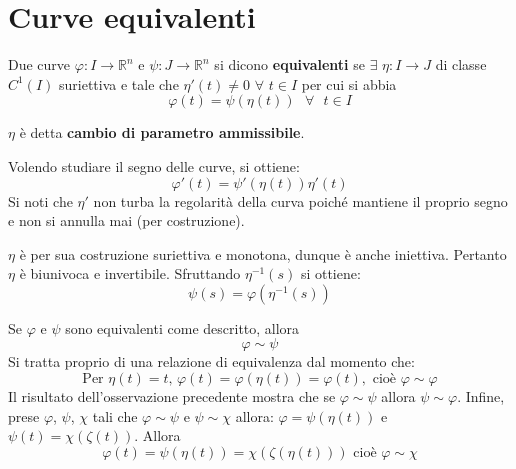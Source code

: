 \section{Curve equivalenti}
\begin{definition}
    Due curve $\varphi: I\to \mathbb{R}^n$ e $\psi:J\to \mathbb{R}^n$ si dicono \textbf{equivalenti} se $\exists$ $\eta:I\to J$ di classe $C^1(I)$ suriettiva e tale che $\eta'(t) \neq 0$ $\forall$ $t \in I$ per cui si abbia
    \begin{equation}
        \varphi(t)=\psi(\eta(t)) \text{ } \forall \text{ } t \in I
    \end{equation}
\end{definition}
\begin{oss}
    $\eta$ è detta \textbf{cambio di parametro ammissibile}. 
\end{oss}
\begin{oss}
    Volendo studiare il segno delle curve, si ottiene:
    \begin{equation*}
        \varphi'(t)=\psi'(\eta(t))\eta'(t)
    \end{equation*}
    Si noti che $\eta'$ non turba la regolarità della curva poiché mantiene il proprio segno e non si annulla mai (per costruzione).
\end{oss}
\begin{oss}
    $\eta$ è per sua costruzione suriettiva e monotona, dunque è anche iniettiva. Pertanto $\eta$ è biunivoca e invertibile. Sfruttando $\eta^{-1}(s)$ si ottiene:
    \begin{equation}
        \psi(s)=\varphi(\eta^{-1}(s))
    \end{equation}
\end{oss}
\begin{oss}
    Se $\varphi$ e $\psi$ sono equivalenti come descritto, allora
    \begin{equation}
        \varphi\sim\psi
    \end{equation}
    Si tratta proprio di una relazione di equivalenza dal momento che:
    \begin{equation}
        \text{Per } \eta(t)=t \text{, } \varphi(t)=\varphi(\eta(t))=\varphi(t), \text{ cioè } \varphi\sim\varphi
    \end{equation}
    Il risultato dell'osservazione precedente mostra che se $\varphi\sim\psi$ allora $\psi\sim\varphi$.
    Infine, prese $\varphi$, $\psi$, $\chi$ tali che $\varphi\sim\psi$ e $\psi\sim\chi$ allora:
    $\varphi=\psi(\eta(t))$ e $\psi(t)=\chi(\zeta(t))$. Allora
    \begin{equation}
        \varphi(t)=\psi(\eta(t))=\chi(\zeta(\eta(t))) \text{ cioè } \varphi\sim\chi
    \end{equation}
\end{oss}
